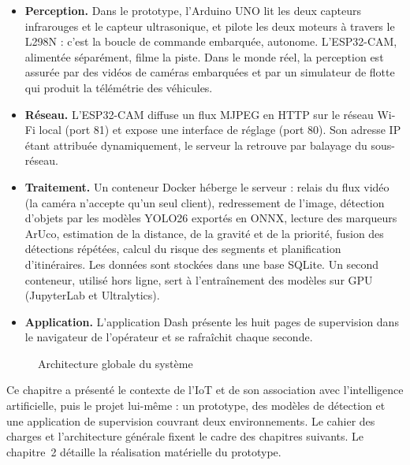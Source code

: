\begin{itemize}
  \item \textbf{Perception.} Dans le prototype, l'Arduino UNO lit les deux capteurs infrarouges et le capteur
        ultrasonique, et pilote les deux moteurs à travers le L298N : c'est la boucle de commande embarquée, autonome.
        L'ESP32-CAM, alimentée séparément, filme la piste. Dans le monde réel, la perception est assurée par des
        vidéos de caméras embarquées et par un simulateur de flotte qui produit la télémétrie des véhicules.
  \item \textbf{Réseau.} L'ESP32-CAM diffuse un flux MJPEG en HTTP sur le réseau Wi-Fi local (port 81) et expose une
        interface de réglage (port 80). Son adresse IP étant attribuée dynamiquement, le serveur la retrouve par
        balayage du sous-réseau.
  \item \textbf{Traitement.} Un conteneur Docker héberge le serveur : relais du flux vidéo (la caméra n'accepte
        qu'un seul client), redressement de l'image, détection d'objets par les modèles YOLO26 exportés en ONNX,
        lecture des marqueurs ArUco, estimation de la distance, de la gravité et de la priorité, fusion des
        détections répétées, calcul du risque des segments et planification d'itinéraires. Les données sont
        stockées dans une base SQLite. Un second conteneur, utilisé hors ligne, sert à l'entraînement des modèles
        sur GPU (JupyterLab et Ultralytics).
  \item \textbf{Application.} L'application Dash présente les huit pages de supervision dans le navigateur de
        l'opérateur et se rafraîchit chaque seconde.
\end{itemize}

\begin{figure}[H]
\centering
\resizebox{\linewidth}{!}{%
}
\caption{Architecture globale du système}
\label{fig:architecture}
\end{figure}

\chapconclusion
Ce chapitre a présenté le contexte de l'IoT et de son association avec l'intelligence artificielle, puis le projet
lui-même : un prototype, des modèles de détection et une application de supervision couvrant deux
environnements. Le cahier des charges et l'architecture générale fixent le cadre des chapitres suivants. Le
chapitre~2 détaille la réalisation matérielle du prototype.
